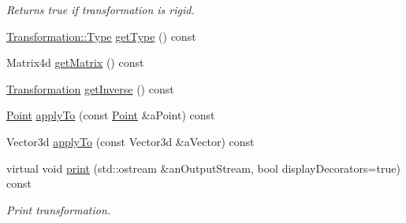 \begin{DoxyCompactItemize}
\begin{DoxyCompactList}\small\item\em Returns true if transformation is rigid. \end{DoxyCompactList}\item 
\hyperlink{classlibrary_1_1math_1_1geom_1_1d3_1_1_transformation_a25f1dc99d391174bf82a7132d08b2fc1}{Transformation\+::\+Type} \hyperlink{classlibrary_1_1math_1_1geom_1_1d3_1_1_transformation_a719b99d5613e2070007e19364b0ec7ac}{get\+Type} () const
\item 
Matrix4d \hyperlink{classlibrary_1_1math_1_1geom_1_1d3_1_1_transformation_ace5db8c23a30c09ace877d7e5f79695e}{get\+Matrix} () const
\item 
\hyperlink{classlibrary_1_1math_1_1geom_1_1d3_1_1_transformation}{Transformation} \hyperlink{classlibrary_1_1math_1_1geom_1_1d3_1_1_transformation_a4e3bd6d4533bb6bcb5ec5e66fcf53db4}{get\+Inverse} () const
\item 
\hyperlink{classlibrary_1_1math_1_1geom_1_1d3_1_1objects_1_1_point}{Point} \hyperlink{classlibrary_1_1math_1_1geom_1_1d3_1_1_transformation_aa6e1d09d2c3c45dda7179118a1969238}{apply\+To} (const \hyperlink{classlibrary_1_1math_1_1geom_1_1d3_1_1objects_1_1_point}{Point} \&a\+Point) const
\item 
Vector3d \hyperlink{classlibrary_1_1math_1_1geom_1_1d3_1_1_transformation_ac5fb182db7d89722baafa37b074ba44c}{apply\+To} (const Vector3d \&a\+Vector) const
\item 
virtual void \hyperlink{classlibrary_1_1math_1_1geom_1_1d3_1_1_transformation_a0cafbc8affb176f6774af01b98536e69}{print} (std\+::ostream \&an\+Output\+Stream, bool display\+Decorators=true) const
\begin{DoxyCompactList}\small\item\em Print transformation. \end{DoxyCompactList}\end{DoxyCompactItemize}
